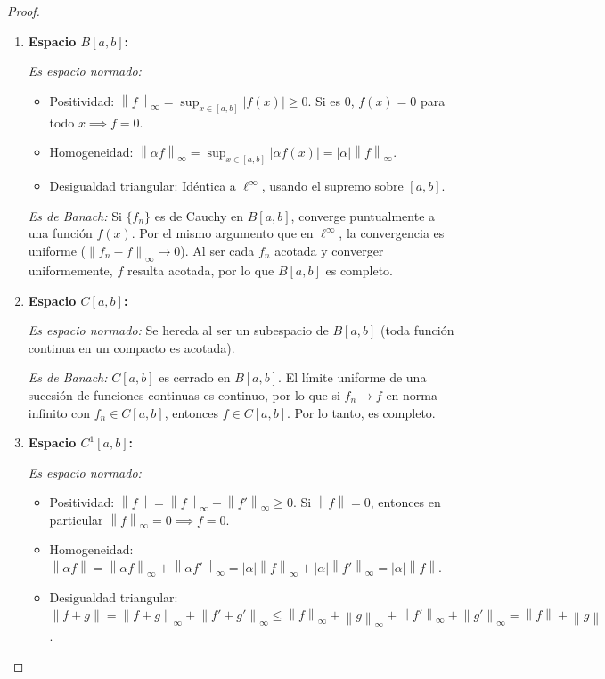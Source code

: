 \documentclass{article}
\theoremstyle{definition}
\newcommand{\norm}[1]{\left\lVert #1 \right\rVert}       %
\begin{document}
\begin{proof}
\begin{enumerate}
        \item \textbf{Espacio \( B[a,b] \):}

              \textit{Es espacio normado:}
              \begin{itemize}
                  \item Positividad: \( \norm{f}_\infty = \sup_{x\in[a,b]} |f(x)| \geq 0 \). Si es \( 0 \), \( f(x)=0 \) para todo \( x \implies f=0 \).
                  \item Homogeneidad: \( \norm{\alpha f}_\infty = \sup_{x\in[a,b]} |\alpha f(x)| = |\alpha| \norm{f}_\infty \).
                  \item Desigualdad triangular: Idéntica a \( \ell^\infty \), usando el supremo sobre \( [a,b] \).
              \end{itemize}

              \textit{Es de Banach:}
              Si \( {\{f_n\}} \) es de Cauchy en \( B[a,b] \), converge puntualmente a una función \( f(x) \). Por el mismo argumento que en \( \ell^\infty \), la convergencia es uniforme (\( \norm{f_n - f}_\infty \to 0 \)). Al ser cada \( f_n \) acotada y converger uniformemente, \( f \) resulta acotada, por lo que \( B[a,b] \) es completo.

        \item \textbf{Espacio \( C[a,b] \):}

              \textit{Es espacio normado:} Se hereda al ser un subespacio de \( B[a,b] \) (toda función continua en un compacto es acotada).

              \textit{Es de Banach:} \( C[a,b] \) es cerrado en \( B[a,b] \). El límite uniforme de una sucesión de funciones continuas es continuo, por lo que si \( f_n \to f \) en norma infinito con \( f_n \in C[a,b] \), entonces \( f \in C[a,b] \). Por lo tanto, es completo.

        \item \textbf{Espacio \( C^1[a,b] \):}

              \textit{Es espacio normado:}
              \begin{itemize}
                  \item Positividad: \( \norm{f} = \norm{f}_\infty + \norm{f'}_\infty \geq 0 \). Si \( \norm{f} = 0 \), entonces en particular \( \norm{f}_\infty = 0 \implies f=0 \).
                  \item Homogeneidad: \( \norm{\alpha f} = \norm{\alpha f}_\infty + \norm{\alpha f'}_\infty = |\alpha|\norm{f}_\infty + |\alpha|\norm{f'}_\infty = |\alpha|\norm{f} \).
                  \item Desigualdad triangular: \( \norm{f+g} = \norm{f+g}_\infty + \norm{f'+g'}_\infty \leq \norm{f}_\infty + \norm{g}_\infty + \norm{f'}_\infty + \norm{g'}_\infty = \norm{f} + \norm{g} \).
              \end{itemize}


\end{enumerate}
\end{proof}
\end{document}
